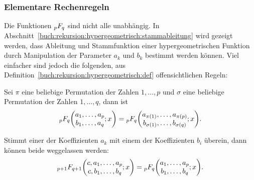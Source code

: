 %
%
\subsubsection{Elementare Rechenregeln}
Die Funktionen $\mathstrut_pF_q$ sind nicht alle unabhängig.
In Abschnitt~\ref{buch:rekursion:hypergeometrisch:stammableitung}
wird gezeigt werden, dass Ableitung und Stammfunktion einer hypergeometrischen
Funktion durch Manipulation der Parameter $a_k$ und $b_k$ bestimmt werden
können.
Viel einfacher sind jedoch die folgenden, aus
Definition~\ref{buch:rekursion:hypergeometrisch:def}
offensichtlichen Regeln:

\begin{satz}[Permutationsregel]
%
%
\label{buch:rekursion:hypergeometrisch:satz:permuationsregel}
Sei $\pi$ eine beliebige Permutation der Zahlen $1,\dots,p$ und $\sigma$ eine
beliebige Permutation der Zahlen $1,\dots,q$, dann ist 
\begin{equation}
\mathstrut_pF_q\biggl(
\begin{matrix}
a_1,\dots,a_p\\b_1,\dots,a_q
\end{matrix}
;x
\biggr)
=
\mathstrut_pF_q\biggl(
\begin{matrix}
a_{\pi(1)},\dots,a_{\pi(p)}\\b_{\sigma(1)},\dots,b_{\sigma(q)}
\end{matrix}
;x
\biggr).
\label{buch:rekursion:hypergeometrisch:eqn:permuationsregel}
\end{equation}
\end{satz}

\begin{satz}[Kürzungsformel]
%
%
\label{buch:rekursion:hypergeometrisch:satz:kuerzungsregel}
Stimmt einer der Koeffizienten $a_k$ mit einem der Koeffizienten $b_i$
überein, dann können beide weggelassen werden:
\begin{equation}
\mathstrut_{p+1}F_{q+1}\biggl(
\begin{matrix}
c,a_1,\dots,a_p\\
c,b_1,\dots,b_q
\end{matrix};
x
\biggr)
=
\mathstrut_{p}F_{q}\biggl(
\begin{matrix}
a_1,\dots,a_p\\
b_1,\dots,b_q
\end{matrix};
x
\biggr).
\label{buch:rekursion:hypergeometrisch:eqn:kuerzungsregel}
\end{equation}
\end{satz}

